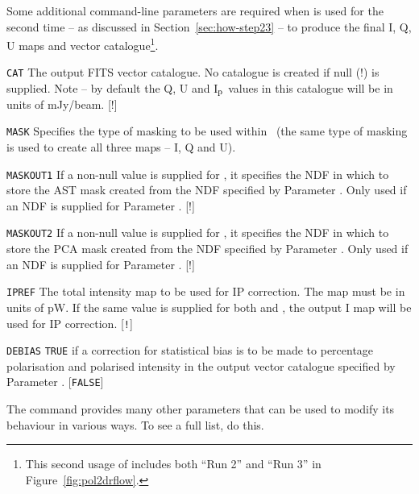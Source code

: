 Some additional command-line parameters are required when  is
used for the second time -- as discussed in Section~\ref{sec:how-step23}
-- to produce the final I, Q, U maps and vector catalogue\footnote{This
second usage of  includes both ``Run 2'' and ``Run 3'' in
Figure~\ref{fig:pol2drflow}.}.

\begin{aligndesc}

\item[\texttt{CAT}] The output FITS vector catalogue. No catalogue is
  created if null (!) is supplied. Note -- by default the Q, U and
  I$_{\textnormal{p}}$ values in this catalogue will be in units of mJy/beam. [!]


\item[\texttt{MASK}] Specifies the type of masking to be used within
  \makemap\ (the same type of masking is used to create all three maps --
  I, Q and U).


\item[\texttt{MASKOUT1}] If a non-null value is supplied for ,
  it specifies the NDF in which to store the AST mask created from the
  NDF specified by Parameter . Only used if an NDF is supplied for
  Parameter . [!]


\item[\texttt{MASKOUT2}] If a non-null value is supplied for ,
  it specifies the NDF in which to store the PCA mask created from the
  NDF specified by Parameter . Only used if an NDF is supplied for
  Parameter . [!]


\item[\texttt{IPREF}] The total intensity map to be used for IP
  correction. The map must be in units of pW. If the same value is
  supplied for both  and , the output I map will be used for
  IP correction. [\texttt{!}]

\item[\texttt{DEBIAS}] \texttt{TRUE} if a correction for statistical bias is to
  be made to percentage polarisation and polarised intensity in the
  output vector catalogue specified by Parameter . [\texttt{FALSE}]
\end{aligndesc}

The  command provides many other parameters that can be used to
modify its behaviour in various ways. To see a full list, do this.

\begin{terminalv}
\end{terminalv}


